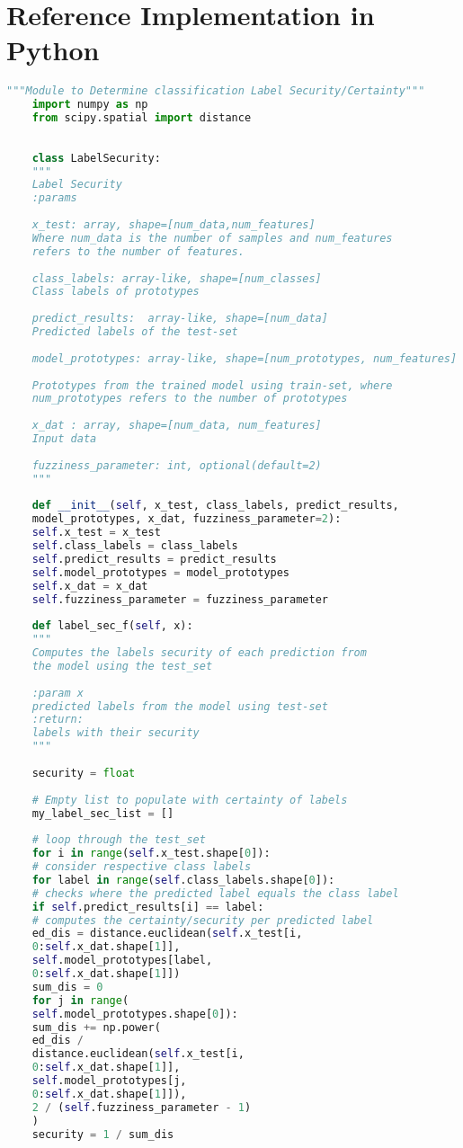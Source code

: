 
\chapter{Reference Implementation in Python}
\begin{lstlisting}[caption=label\textunderscore security1.py ,style=chstyle, language=Python]
	"""Module to Determine classification Label Security/Certainty"""
	import numpy as np
	from scipy.spatial import distance
	
	
	class LabelSecurity:
	"""
	Label Security
	:params
	
	x_test: array, shape=[num_data,num_features]
	Where num_data is the number of samples and num_features
	refers to the number of features.
	
	class_labels: array-like, shape=[num_classes]
	Class labels of prototypes
	
	predict_results:  array-like, shape=[num_data]
	Predicted labels of the test-set
	
	model_prototypes: array-like, shape=[num_prototypes, num_features]
	
	Prototypes from the trained model using train-set, where
	num_prototypes refers to the number of prototypes
	
	x_dat : array, shape=[num_data, num_features]
	Input data
	
	fuzziness_parameter: int, optional(default=2)
	"""
	
	def __init__(self, x_test, class_labels, predict_results,
	model_prototypes, x_dat, fuzziness_parameter=2):
	self.x_test = x_test
	self.class_labels = class_labels
	self.predict_results = predict_results
	self.model_prototypes = model_prototypes
	self.x_dat = x_dat
	self.fuzziness_parameter = fuzziness_parameter
	
	def label_sec_f(self, x):
	"""
	Computes the labels security of each prediction from
	the model using the test_set
	
	:param x
	predicted labels from the model using test-set
	:return:
	labels with their security
	"""
	
	security = float
	
	# Empty list to populate with certainty of labels
	my_label_sec_list = []
	
	# loop through the test_set
	for i in range(self.x_test.shape[0]):		
	# consider respective class labels
	for label in range(self.class_labels.shape[0]):
	# checks where the predicted label equals the class label
	if self.predict_results[i] == label:
	# computes the certainty/security per predicted label
	ed_dis = distance.euclidean(self.x_test[i,
	0:self.x_dat.shape[1]],
	self.model_prototypes[label,
	0:self.x_dat.shape[1]])
	sum_dis = 0
	for j in range(
	self.model_prototypes.shape[0]):
	sum_dis += np.power(
	ed_dis /
	distance.euclidean(self.x_test[i,
	0:self.x_dat.shape[1]],
	self.model_prototypes[j,
	0:self.x_dat.shape[1]]),
	2 / (self.fuzziness_parameter - 1)
	)
	security = 1 / sum_dis
	

\end{lstlisting}
